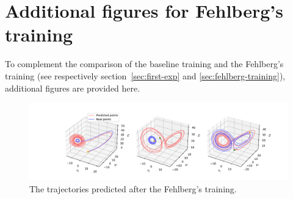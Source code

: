 \documentclass{article}
\begin{document}
\section{Additional figures for Fehlberg's training}
\label{sec:add_fehlberg}
To complement the comparison of the baseline training and the
Fehlberg's training (see respectively section~\ref{sec:first-exp} and
\ref{sec:fehlberg-training}), additional figures are provided here.
\begin{figure}[thb]
  \includegraphics[width=1\textwidth]{./figs/fehlberg_lorenz_3}
  \caption{The trajectories predicted after the Fehlberg's training.}
  \label{fig:fehlberg_lorenz}
\end{figure}
\end{document}
